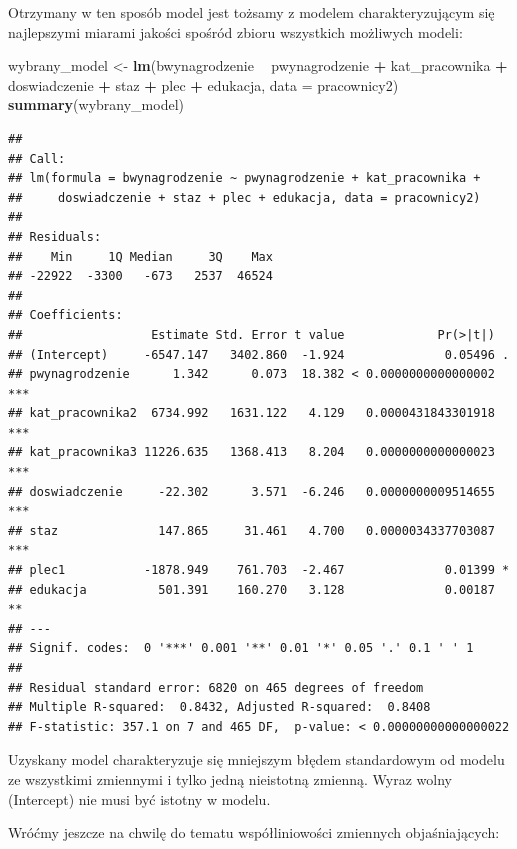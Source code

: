 \documentclass[]{book}
\newenvironment{Shaded}{\begin{snugshade}}{\end{snugshade}}
\newcommand{\DataTypeTok}[1]{\textcolor[rgb]{0.13,0.29,0.53}{#1}}
\newcommand{\KeywordTok}[1]{\textcolor[rgb]{0.13,0.29,0.53}{\textbf{#1}}}
\newcommand{\NormalTok}[1]{#1}
\newcommand{\OperatorTok}[1]{\textcolor[rgb]{0.81,0.36,0.00}{\textbf{#1}}}
\newcommand{\StringTok}[1]{\textcolor[rgb]{0.31,0.60,0.02}{#1}}
\begin{document}
Otrzymany w ten sposób model jest tożsamy z modelem charakteryzującym się najlepszymi miarami jakości spośród zbioru wszystkich możliwych modeli:

\begin{Shaded}
\begin{Highlighting}[]
\NormalTok{wybrany_model <-}\StringTok{ }\KeywordTok{lm}\NormalTok{(bwynagrodzenie }\OperatorTok{~}\StringTok{ }\NormalTok{pwynagrodzenie }\OperatorTok{+}\StringTok{ }\NormalTok{kat_pracownika }\OperatorTok{+}\StringTok{ }\NormalTok{doswiadczenie }\OperatorTok{+}\StringTok{ }\NormalTok{staz }\OperatorTok{+}\StringTok{ }\NormalTok{plec }\OperatorTok{+}\StringTok{ }\NormalTok{edukacja, }\DataTypeTok{data =}\NormalTok{ pracownicy2)}
\KeywordTok{summary}\NormalTok{(wybrany_model)}
\end{Highlighting}
\end{Shaded}

\begin{verbatim}
## 
## Call:
## lm(formula = bwynagrodzenie ~ pwynagrodzenie + kat_pracownika + 
##     doswiadczenie + staz + plec + edukacja, data = pracownicy2)
## 
## Residuals:
##    Min     1Q Median     3Q    Max 
## -22922  -3300   -673   2537  46524 
## 
## Coefficients:
##                  Estimate Std. Error t value             Pr(>|t|)    
## (Intercept)     -6547.147   3402.860  -1.924              0.05496 .  
## pwynagrodzenie      1.342      0.073  18.382 < 0.0000000000000002 ***
## kat_pracownika2  6734.992   1631.122   4.129   0.0000431843301918 ***
## kat_pracownika3 11226.635   1368.413   8.204   0.0000000000000023 ***
## doswiadczenie     -22.302      3.571  -6.246   0.0000000009514655 ***
## staz              147.865     31.461   4.700   0.0000034337703087 ***
## plec1           -1878.949    761.703  -2.467              0.01399 *  
## edukacja          501.391    160.270   3.128              0.00187 ** 
## ---
## Signif. codes:  0 '***' 0.001 '**' 0.01 '*' 0.05 '.' 0.1 ' ' 1
## 
## Residual standard error: 6820 on 465 degrees of freedom
## Multiple R-squared:  0.8432, Adjusted R-squared:  0.8408 
## F-statistic: 357.1 on 7 and 465 DF,  p-value: < 0.00000000000000022
\end{verbatim}

Uzyskany model charakteryzuje się mniejszym błędem standardowym od modelu ze wszystkimi zmiennymi i tylko jedną nieistotną zmienną. Wyraz wolny (Intercept) nie musi być istotny w modelu.

Wróćmy jeszcze na chwilę do tematu współliniowości zmiennych objaśniających:
\end{document}
